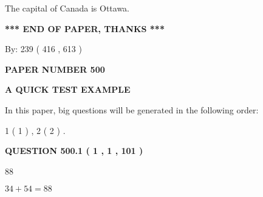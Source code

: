 \documentclass[12pt]{article}
\begin{document}
 
The capital of Canada is Ottawa.
 
 
 
 
   
   
 \vspace{0.2in}
 
   
   
   
   
\vspace{1.0in} 
{\textbf{\large{ *** END OF PAPER, THANKS *** }}} 
   
   
\hspace{1.0in} By: 
 239 ( 416 ,  613 )
   
   
   
   
\newpage 
\setcounter{page}{ 
   500001 } 
   
   
   
   
 {\textbf{ \Large{ PAPER NUMBER  500  }}}
   
   
\vspace{0.2in}
   
   
   
   
   
   
 \vspace{0.2in}
{\LARGE {\textbf{ A QUICK TEST EXAMPLE}}}
   
   
   
\vspace{0.2in}
   
In this paper, big questions will be generated in the following order: 
   
   
   1 ( 1 )
 ,
   2 ( 2 )
 .
  
\vspace{0.2in}
  
{\textbf{\Large{QUESTION
500.1 
 ( 1 , 1 , 101 )
}}}
  
  
 
 
\noindent{}

88
 
 
 
 
\noindent{}

$ %
34 +  %
54=   %
88$
 
 
  
\vspace{0.2in}
  
\end{document}
